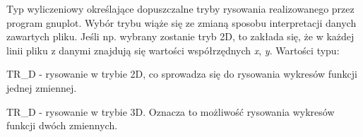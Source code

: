 Typ wyliczeniowy określające dopuszczalne tryby rysowania realizowanego przez program {\ttfamily gnuplot}. Wybór trybu wiąże się ze zmianą sposobu interpretacji danych zawartych pliku. Jeśli np. wybrany zostanie tryb 2\+D, to zakłada się, że w każdej linii pliku z danymi znajdują się wartości współrzędnych {\itshape x}, {\itshape y}. Wartości typu\+: \begin{DoxyItemize}
\item {\ttfamily T\+R\+\_\+D} -\/ rysowanie w trybie 2\+D, co sprowadza się do rysowania wykresów funkcji jednej zmiennej. \item {\ttfamily T\+R\+\_\+D} -\/ rysowanie w trybie 3\+D. Oznacza to możliwość rysowania wykresów funkcji dwóch zmiennych. \end{DoxyItemize}
